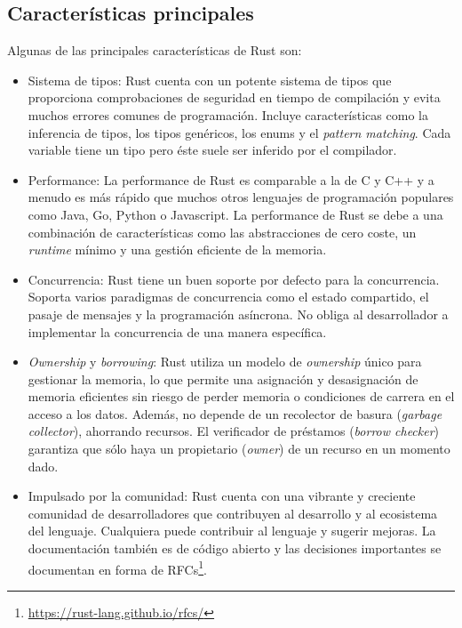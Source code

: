 \subsection{Características principales}

Algunas de las principales características de Rust son:

\begin{itemize}
      \item Sistema de tipos: Rust cuenta con un potente sistema de tipos que proporciona
            comprobaciones de seguridad en tiempo de compilación y evita muchos errores comunes
            de programación. Incluye características como la inferencia de tipos, los tipos genéricos,
            los enums y el \textit{pattern matching}. Cada variable tiene un tipo pero éste suele ser
            inferido por el compilador.
      \item Performance: La performance de Rust es comparable a la de C y C++ y a menudo es más
            rápido que muchos otros lenguajes de programación populares como Java, Go, Python o
            Javascript. La performance de Rust se debe a una combinación de
            características como las abstracciones de cero coste, un \textit{runtime} mínimo y
            una gestión eficiente de la memoria.
      \item Concurrencia: Rust tiene un buen soporte por defecto para la concurrencia. Soporta varios
            paradigmas de concurrencia como el estado compartido, el pasaje de mensajes y la
            programación asíncrona. No obliga al desarrollador a implementar la concurrencia de una
            manera específica.
      \item \textit{Ownership} y \textit{borrowing}: Rust utiliza un modelo de \textit{ownership} único para gestionar la
            memoria, lo que permite una asignación y desasignación de memoria eficientes sin riesgo
            de perder memoria o condiciones de carrera en el acceso a los datos.
            Además, no depende de un recolector de basura (\textit{garbage collector}),
            ahorrando recursos. El verificador de préstamos (\textit{borrow checker}) garantiza que sólo haya un
            propietario (\textit{owner}) de un recurso en un momento dado.
      \item Impulsado por la comunidad: Rust cuenta con una vibrante y creciente comunidad de
            desarrolladores que contribuyen al desarrollo y al ecosistema del lenguaje. Cualquiera
            puede contribuir al lenguaje y sugerir mejoras. La documentación también es de código abierto y las decisiones
            importantes se documentan en forma de \acrfull{RFCs}\footnote{\url{https://rust-lang.github.io/rfcs/}}.
\end{itemize}

